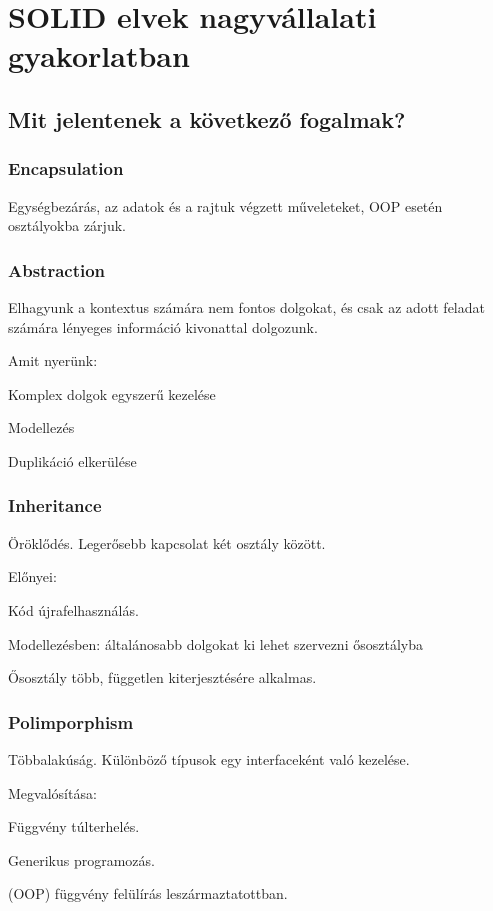 \documentclass[a4paper,14pt]{extarticle}
\begin{document}
	
	
	
	\tableofcontents
	\newpage
	\section{SOLID elvek nagyvállalati gyakorlatban}
		\subsection{Mit jelentenek a következő fogalmak?}
			\subsubsection{Encapsulation}
			Egységbezárás, az adatok és a rajtuk végzett műveleteket, OOP esetén osztályokba zárjuk.
			
			\subsubsection{Abstraction}
			Elhagyunk a kontextus számára nem fontos dolgokat, és csak az adott feladat számára lényeges információ kivonattal dolgozunk. 
			\par Amit nyerünk: 
			\begin{compactitem}
				\item Komplex dolgok egyszerű kezelése
				\item Modellezés
				\item Duplikáció elkerülése
			\end{compactitem}
			
			\subsubsection{Inheritance}
			\label{inh}
			Öröklődés. Legerősebb kapcsolat két osztály között.
			\par Előnyei: 
			\begin{compactitem}
				\item Kód újrafelhasználás.
				\item Modellezésben: általánosabb dolgokat ki lehet szervezni ősosztályba
				\item Ősosztály több, független kiterjesztésére alkalmas.
			\end{compactitem}
			
			\subsubsection{Polimporphism}
			Többalakúság. Különböző típusok egy interfaceként való kezelése.
			\par Megvalósítása: 
			\begin{compactitem}
				\item Függvény túlterhelés.
				\item Generikus programozás.
				\item (OOP) függvény felülírás leszármaztatottban.
			\end{compactitem}
		
\end{document}
